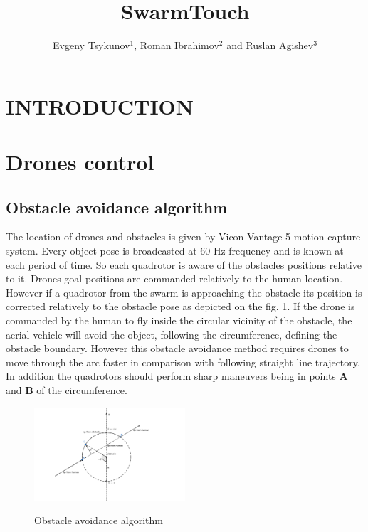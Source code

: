\documentclass[letterpaper, 10 pt, conference]{ieeeconf}  %
\title{\LARGE \bf
SwarmTouch
}
\author{Evgeny Tsykunov$^{1}$, Roman Ibrahimov$^{2}$ and Ruslan Agishev$^{3}$%
}
\begin{document}
\maketitle
\thispagestyle{empty}
\pagestyle{empty}


\begin{abstract}

\end{abstract}


\section{INTRODUCTION}




\section{Drones control}

\subsection{Obstacle avoidance algorithm}

The location of drones and obstacles is given by Vicon Vantage 5 motion capture system. Every object pose is broadcasted at 60 Hz frequency and is known at each period of time. So each quadrotor is aware of the obstacles positions relative to it. Drones goal positions are commanded relatively to the human location. However if a quadrotor from the swarm is approaching the obstacle its position is corrected relatively to the obstacle pose as depicted on the fig. 1. If the drone is commanded by the human to fly inside the circular vicinity of the obstacle, the aerial vehicle will avoid the object, following the circumference, defining the obstacle boundary.
However this obstacle avoidance method requires drones to move through the arc faster in comparison with following straight line trajectory. In addition the quadrotors should perform sharp maneuvers being in points $\boldsymbol{A}$ and $\boldsymbol{B}$ of the circumference.

\begin{figure}
\centering
\includegraphics[width=0.5\textwidth]{figures/obstacle_avoidance.png}\label{true}
\caption{Obstacle avoidance algorithm}
\label{obstacle}
\end{figure}
\end{document}
